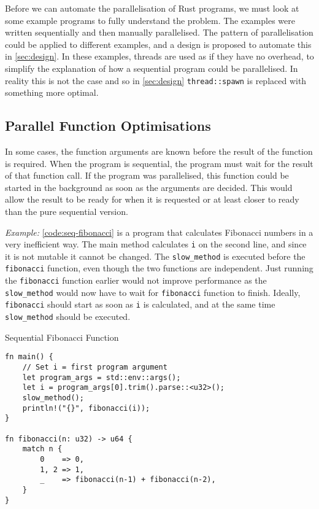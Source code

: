 \documentclass[conference]{IEEEtran}
\begin{document}
Before we can automate the parallelisation of Rust programs, we must look at some example programs to fully understand the problem. The examples were written sequentially and then manually parallelised. The pattern of parallelisation could be applied to different examples, and a design is proposed to automate this in \autoref{sec:design}. In these examples, threads are used as if they have no overhead, to simplify the explanation of how a sequential program could be parallelised. In reality this is not the case and so in \autoref{sec:design} \texttt{thread::spawn} is replaced with something more optimal.

\subsection{Parallel Function Optimisations}
In some cases, the function arguments are known before the result of the function is required. When the program is sequential, the program must wait for the result of that function call. If the program was parallelised, this function could be started in the background as soon as the arguments are decided. This would allow the result to be ready for when it is requested or at least closer to ready than the pure sequential version.

\textit{Example:}
\autoref{code:seq-fibonacci} is a program that calculates Fibonacci numbers in a very inefficient way. The main method calculates \texttt{i} on the second line, and since it is not mutable it cannot be changed. The \texttt{slow\_method} is executed before the \texttt{fibonacci} function, even though the two functions are independent. Just running the \texttt{fibonacci} function earlier would not improve performance as the \texttt{slow\_method} would now have to wait for \texttt{fibonacci} function to finish. Ideally, \texttt{fibonacci} should start as soon as \texttt{i} is calculated, and at the same time \texttt{slow\_method} should be executed.

\begin{algorithm}
\caption{Sequential Fibonacci Function}
\label{code:seq-fibonacci}
\begin{verbatim}
fn main() {
    // Set i = first program argument
    let program_args = std::env::args();
    let i = program_args[0].trim().parse::<u32>();
    slow_method();
    println!("{}", fibonacci(i));
}

fn fibonacci(n: u32) -> u64 {
    match n {
        0    => 0,
        1, 2 => 1,
        _    => fibonacci(n-1) + fibonacci(n-2),
    }
}
\end{verbatim}
\end{algorithm}
\end{document}
